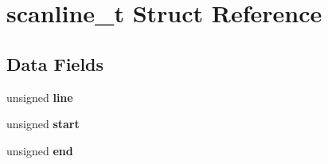 \hypertarget{structscanline__t}{
\section{scanline\_\-t Struct Reference}
\label{structscanline__t}
}
\subsection*{Data Fields}
\begin{DoxyCompactItemize}
\item 
\hypertarget{structscanline__t_a05ef0c4dbeec4fc8ccb225de9c26d896}{
unsigned {\bfseries line}}
\label{structscanline__t_a05ef0c4dbeec4fc8ccb225de9c26d896}

\item 
\hypertarget{structscanline__t_a0ddd26c18444312e92c51d9e3567232a}{
unsigned {\bfseries start}}
\label{structscanline__t_a0ddd26c18444312e92c51d9e3567232a}

\item 
\hypertarget{structscanline__t_a05c8a1e4a3e6a67bc596488229b87db3}{
unsigned {\bfseries end}}
\label{structscanline__t_a05c8a1e4a3e6a67bc596488229b87db3}

\end{DoxyCompactItemize}
